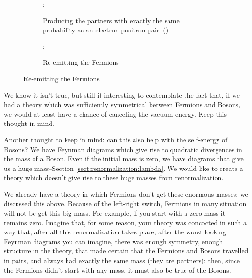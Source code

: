 \documentclass[]{article}
\begin{document}
\begin{figure}[H]
	\begin{center}
		\caption{Why there isn't a Boson equivalent to the electron}
		\begin{subfigure}{0.45\textwidth}
			\caption{Producing the partners with exactly the same probability as an electron-positron pair--()}\label{fig:partners}
			;
		\end{subfigure}
		\hfill
		\begin{subfigure}{0.45\textwidth}
			\caption{Re-emitting the Fermions}\label{fig:re:emit}
			;
		\end{subfigure}
	\end{center}
\end{figure}

We know it isn't true, but still it interesting to contemplate the fact that,  if we had a theory which was sufficiently symmetrical between Fermions and Bosons, we would at least have a chance of canceling the vacuum energy. Keep this thought in mind.
 
Another thought to keep in mind: can this also help with the self-energy of Bosons? We have Feynman diagrams which give rise to quadratic divergences in the mass of a Boson. Even if the initial mass is zero, we have diagrams that give us a huge mass--Section \ref{sect:renormalization:lambda}. We would like to create a theory which doesn't give rise to these huge masses from renormalization.

We already have a theory in which Fermions don't get these enormous masses: we discussed this above. Because of the left-right switch, Fermions in many situation will not be get this big mass. For example, if you start with a zero mass it remains zero. Imagine that, for some reason, your theory was concocted in such a way that, after all this renormalization takes place, after the worst looking Feynman diagrams you can imagine, there was enough symmetry, enough structure in the theory, that made certain that the Fermions and Bosons travelled in pairs, and always had exactly the same mass (they are partners); then, since the Fermions didn't start with any mass, it must also be true of the Bosons.
\end{document}
